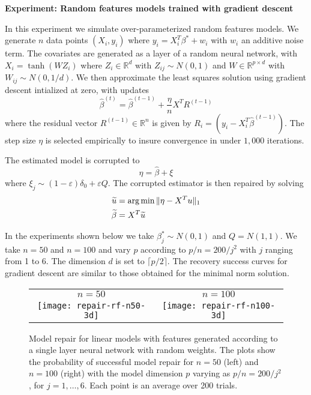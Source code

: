 \documentclass[12pt,pdftex,noinfoline]{imsart}
\DeclareMathOperator*{\argmin}{\arg\min}
\numberwithin{equation}{section}
\theoremstyle{remark}
\def\reals{\mathbb{R}}
\def\argmin{\mathop{\text{arg\,min}}}
\let\hat\widehat
\let\tilde\widetilde
\let\epsilon\varepsilon
\begin{document}
\let\epsilon\varepsilon

{\large\bf Experiment: Random features models trained with gradient descent}
\vskip10pt

In this experiment we simulate over-parameterized random features models.
We generate $n$ data points $(X_i, y_i)$ where
$y_i = X_i^T \beta^* + w_i$ with $w_i$ an additive noise term. The covariates are generated
as a layer of a random neural network, with $X_i = \tanh(WZ_i)$ where $Z_i \in\reals^d$ with $Z_{ij} \sim N(0,1)$
and $W\in\reals^{p\times d}$ with $W_{ij} \sim N(0, 1/d)$. We then approximate the least squares
solution using gradient descent intialized at zero, with updates
\begin{equation}
  \hat\beta^{(t)} = \hat\beta^{(t-1)} + \frac{\eta}{n} X^T R^{(t-1)}
\end{equation}
where the residual vector $R^{(t-1)}\in\reals^n$ is given by $R_i = (y_i - X_i^ T\hat\beta^{(t-1)})$.
The step size $\eta$ is selected empirically to insure convergence in under $1{,}000$ iterations.

The estimated model is corrupted to
\begin{equation}
  \eta = \hat\beta + \xi
\end{equation}
where $\xi_j \sim (1-\epsilon) \delta_0 +\epsilon Q$. The corrupted estimator is then repaired by solving
\begin{align}
  \tilde u &= \argmin \|\eta - X^T u\|_1 \\
  \tilde \beta &= X^T \tilde u
\end{align}

In the experiments shown below we take $\beta_j^* \sim N(0,1)$ and $Q = N(1,1)$. We take $n=50$ and $n=100$ and vary $p$ according to $p/n=200/j^2$ with
$j$ ranging from 1 to 6. The dimension $d$ is set to $\lceil p/2\rceil$. The recovery success curves for gradient descent are similar to those obtained for the minimal norm solution.

\begin{figure}[ht]
  \begin{center}
    \begin{tabular}{cc}
      $n=50$ & $n=100$\\[-20pt]
      \texttt{[image: repair-rf-n50-3d]} &
      \texttt{[image: repair-rf-n100-3d]}\\[-10pt]
    \end{tabular}
  \end{center}
\caption{Model repair for linear models with features generated according to a single layer neural
network with random weights. The plots show the probability of successful model repair for $n=50$ (left) and $n=100$ (right) with the model dimension $p$ varying as $p/n = 200 /j^2$, for $j=1,\ldots, 6$. Each point is an average over 200 trials.}
\end{figure}
\end{document}

